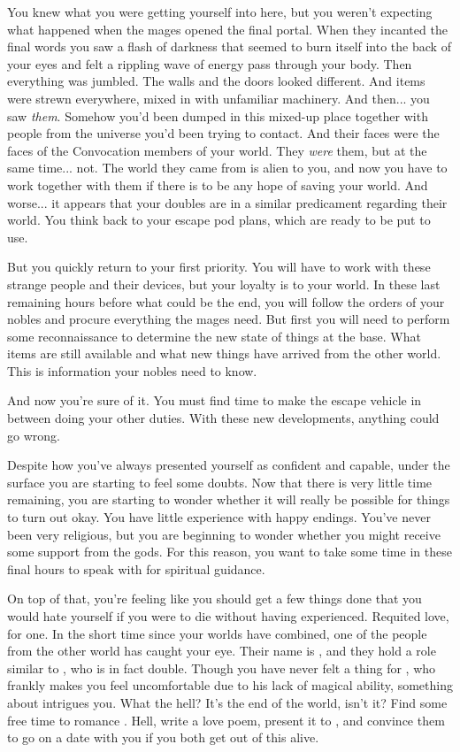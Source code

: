 \documentclass[char]{guildcamp3}
\begin{document}
You knew what you were getting yourself into here, but you weren't expecting what happened when the mages opened the final portal. When they incanted the final words you saw a flash of darkness that seemed to burn itself into the back of your eyes and felt a rippling wave of energy pass through your body. Then everything was jumbled. The walls and the doors looked different. And items were strewn everywhere, mixed in with unfamiliar machinery. And then... you saw \emph{them}. Somehow you'd been dumped in this mixed-up place together with people from the universe you'd been trying to contact. And their faces were the faces of the Convocation members of your world. They \emph{were} them, but at the same time... not. The world they came from is alien to you, and now you have to work together with them if there is to be any hope of saving your world. And worse... it appears that your doubles are in a similar predicament regarding their world. You think back to your escape pod plans, which are ready to be put to use.

But you quickly return to your first priority. You will have to work with these strange people and their devices, but your loyalty is to your world. In these last remaining hours before what could be the end, you will follow the orders of your nobles and procure everything the mages need. But first you will need to perform some reconnaissance to determine the new state of things at the base. What items are still available and what new things have arrived from the other world. This is information your nobles need to know.

And now you're sure of it. You must find time to make the escape vehicle in between doing your other duties. With these new developments, anything could go wrong.

Despite how you've always presented yourself as confident and capable, under the surface you are starting to feel some doubts. Now that there is very little time remaining, you are starting to wonder whether it will really be possible for things to turn out okay. You have little experience with happy endings. You've never been very religious, but you are beginning to wonder whether you might receive some support from the gods. For this reason, you want to take some time in these final hours to speak with \cPaladin{} for spiritual guidance.

On top of that, you're feeling like you should get a few things done that you would hate yourself if you were to die without having experienced. Requited love, for one. In the short time since your worlds have combined, one of the people from the other world has caught your eye. Their name is \cPoliOne{\intro}, and they hold a role similar to \cNobleOne{}, who is in fact \cPoliOne{\their} double. Though you have never felt a thing for \cNobleOne{}, who frankly makes you feel uncomfortable due to his lack of magical ability, something about \cPoliOne{} intrigues you. What the hell? It's the end of the world, isn't it? Find some free time to romance \cPoliOne{\them}. Hell, write \cPoliOne{\them} a love poem, present it to \cPoliOne{\them}, and convince them to go on a date with you if you both get out of this alive. 
\end{document}
